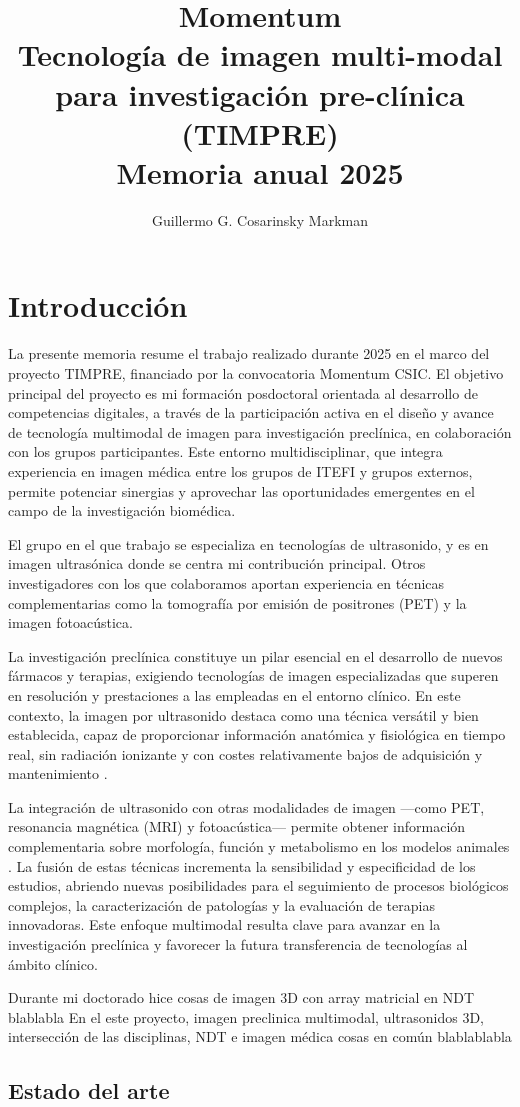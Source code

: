 \documentclass[10pt,a4paper]{report}
\title{Momentum \\ Tecnología de imagen multi-modal para investigación pre-clínica (TIMPRE) \\ Memoria anual 2025}
\author{Guillermo G. Cosarinsky Markman}
\date{}
\begin{document}
	
\maketitle

\chapter{Introducción}
La presente memoria resume el trabajo realizado durante 2025 en el marco del proyecto TIMPRE, financiado por la convocatoria Momentum CSIC. El objetivo principal del proyecto es mi formación posdoctoral orientada al desarrollo de competencias digitales, a través de la participación activa en el diseño y avance de tecnología multimodal de imagen para investigación preclínica, en colaboración con los grupos participantes. Este entorno multidisciplinar, que integra experiencia en imagen médica entre los grupos de ITEFI y grupos externos, permite potenciar sinergias y aprovechar las oportunidades emergentes en el campo de la investigación biomédica.

El grupo en el que trabajo se especializa en tecnologías de ultrasonido, y es en imagen ultrasónica donde se centra mi contribución principal. Otros investigadores con los que colaboramos aportan experiencia en técnicas complementarias como la tomografía por emisión de positrones (PET) y la imagen fotoacústica.

La investigación preclínica constituye un pilar esencial en el desarrollo de nuevos fármacos y terapias, exigiendo tecnologías de imagen especializadas que superen en resolución y prestaciones a las empleadas en el entorno clínico. En este contexto, la imagen por ultrasonido destaca como una técnica versátil y bien establecida, capaz de proporcionar información anatómica y fisiológica en tiempo real, sin radiación ionizante y con costes relativamente bajos de adquisición y mantenimiento \cite{Moran2020}.

La integración de ultrasonido con otras modalidades de imagen —como PET, resonancia magnética (MRI) y fotoacústica— permite obtener información complementaria sobre morfología, función y metabolismo en los modelos animales \cite{Wu2018}. La fusión de estas técnicas incrementa la sensibilidad y especificidad de los estudios, abriendo nuevas posibilidades para el seguimiento de procesos biológicos complejos, la caracterización de patologías y la evaluación de terapias innovadoras. Este enfoque multimodal resulta clave para avanzar en la investigación preclínica y favorecer la futura transferencia de tecnologías al ámbito clínico.


Durante mi doctorado hice cosas de imagen 3D con array matricial en NDT blablabla
En el este proyecto, imagen preclinica multimodal, ultrasonidos 3D, intersección de las disciplinas, NDT e imagen médica cosas en común blablablabla

\section{Estado del arte}
\end{document}
